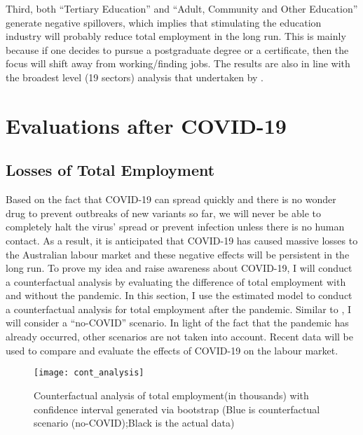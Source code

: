 \documentclass{monashthesis}
\begin{document}
Third, both ``Tertiary Education'' and ``Adult, Community and Other Education'' generate negative spillovers, which implies that stimulating the education industry will probably reduce total employment in the long run. This is mainly because if one decides to pursue a postgraduate degree or a certificate, then the focus will shift away from working/finding jobs. The results are also in line with the broadest level (19 sectors) analysis that undertaken by \textcite{anderson2020}.

\hypertarget{evaluations-after-covid-19}{%
\section{Evaluations after COVID-19}\label{evaluations-after-covid-19}}

\hypertarget{losses-of-total-employment}{%
\subsection{Losses of Total Employment}\label{losses-of-total-employment}}

Based on the fact that COVID-19 can spread quickly and there is no wonder drug to prevent outbreaks of new variants so far, we will never be able to completely halt the virus' spread or prevent infection unless there is no human contact. As a result, it is anticipated that COVID-19 has caused massive losses to the Australian labour market and these negative effects will be persistent in the long run. To prove my idea and raise awareness about COVID-19, I will conduct a counterfactual analysis by evaluating the difference of total employment with and without the pandemic. In this section, I use the estimated model to conduct a counterfactual analysis for total employment after the pandemic. Similar to \textcite{anderson2020}, I will consider a ``no-COVID'' scenario. In light of the fact that the pandemic has already occurred, other scenarios are not taken into account. Recent data will be used to compare and evaluate the effects of COVID-19 on the labour market.

\begin{figure}[H]
\texttt{[image: cont\_analysis]}
\centering
\caption{Counterfactual analysis of total employment(in thousands) with confidence interval generated via bootstrap (Blue is counterfactual scenario (no-COVID);Black is the actual data)}
\label{fig:con}
\end{figure}
\end{document}
